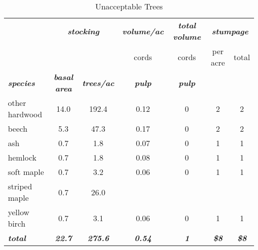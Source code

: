 \documentclass[landscape]{article}
\begin{document}
\begin{table}[H]

\caption{\label{tab:unnamed-chunk-36}Unacceptable Trees}
\fontsize{10}{12}\selectfont
\begin{tabular}[t]{lcccccc}
\toprule
\multicolumn{1}{c}{\em{\textbf{ }}} & \multicolumn{2}{c}{\em{\textbf{stocking}}} & \multicolumn{1}{c}{\em{\textbf{volume/ac }}} & \multicolumn{1}{c}{\em{\textbf{total volume}}} & \multicolumn{2}{c}{\em{\textbf{stumpage}}} \\
\cmidrule(l{3pt}r{3pt}){2-3} \cmidrule(l{3pt}r{3pt}){4-4} \cmidrule(l{3pt}r{3pt}){5-5} \cmidrule(l{3pt}r{3pt}){6-7}
\multicolumn{3}{c}{ } & \multicolumn{1}{c}{cords} & \multicolumn{1}{c}{cords} & \multicolumn{1}{c}{per acre} & \multicolumn{1}{c}{total} \\
\cmidrule(l{3pt}r{3pt}){4-4} \cmidrule(l{3pt}r{3pt}){5-5} \cmidrule(l{3pt}r{3pt}){6-6} \cmidrule(l{3pt}r{3pt}){7-7}
\rowcolor[HTML]{DCDCDC}  \em{\textbf{species}} & \em{\textbf{basal area}} & \em{\textbf{trees/ac}} & \em{\textbf{pulp}} & \em{\textbf{pulp}} & \em{\textbf{ }} & \em{\textbf{ }}\\
\midrule
\rowcolor{gray!6}  other hardwood & 14.0 & 192.4 & 0.12 & 0 & 2 & 2\\
 
beech & 5.3 & 47.3 & 0.17 & 0 & 2 & 2\\
 
\rowcolor{gray!6}  ash & 0.7 & 1.8 & 0.07 & 0 & 1 & 1\\
 
hemlock & 0.7 & 1.8 & 0.08 & 0 & 1 & 1\\
 
\rowcolor{gray!6}  soft maple & 0.7 & 3.2 & 0.06 & 0 & 1 & 1\\
 
striped maple & 0.7 & 26.0 &  &  &  & \\
 
\rowcolor{gray!6}  yellow birch & 0.7 & 3.1 & 0.06 & 0 & 1 & 1\\
 
\rowcolor[HTML]{DCDCDC}  \em{\textbf{total}} & \em{\textbf{22.7}} & \em{\textbf{275.6}} & \em{\textbf{0.54}} & \em{\textbf{1}} & \em{\textbf{\$8}} & \em{\textbf{\$8}}\\
\bottomrule
\end{tabular}
\end{table}
\end{document}
